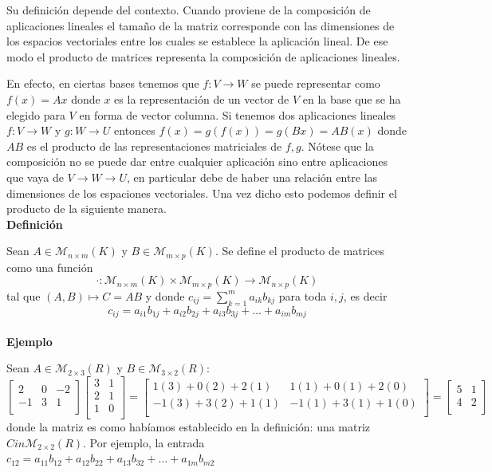 \documentclass[10pt]{article}
\begin{document}
Su definición depende del contexto. Cuando proviene de la composición de aplicaciones lineales el tamaño de la matriz corresponde con las dimensiones de los espacios vectoriales entre los cuales se establece la aplicación lineal. De ese modo el producto de matrices representa la composición de aplicaciones lineales.

En efecto, en ciertas bases tenemos que $f : V \longrightarrow W$ se puede representar como $f(x) = Ax$ donde $x$ es la representación de un vector de $V$ en la base que se ha elegido para $V$ en forma de vector columna. Si tenemos dos aplicaciones lineales $f : V \longrightarrow W$ y $g : W \longrightarrow U$ entonces $f(x) = g(f(x)) = g(Bx) = AB(x)$ donde $AB$ es el producto de las representaciones matriciales de $f, g$. Nótese que la composición no se puede dar entre cualquier aplicación sino entre aplicaciones que vaya de $V \rightarrow W \rightarrow U$, en particular debe de haber una relación entre las dimensiones de los espaciones vectoriales. Una vez dicho esto podemos definir el producto de la siguiente manera. \\

\noindent\textbf{Definición}

Sean $A \in \mathcal{M}_{n\times {m}}(K)$ y  $B \in \mathcal{M}_{m\times {p}}(K)$. Se define el producto de matrices como una función
$$
\cdot : \mathcal{M}_{n\times {m}}(K) \times \mathcal{M}_{m\times {p}}(K) \longrightarrow \mathcal{M}_{n\times {p}}(K)
$$ 
tal que $(A,B) \mapsto C = AB$ y donde $c_{ij}= \sum\limits_{k=1}^m a_{ik}b_{kj}$ para toda $i, j$, es decir
$$
c_{ij} = a_{i1}b_{1j} + a_{i2}b_{2j} + a_{i3}b_{3j} + \ldots + a_{im}b_{mj}
$$ \\

\noindent\textbf{Ejemplo}

Sean $A \in \mathcal{M}_{2\times {3}}(R)$ y $B \in \mathcal{M}_{3\times {2}}(R)$:
$$
\begin{bmatrix}
2 & 0 & -2 \\
-1 & 3 & 1 \\
\end{bmatrix}
\begin{bmatrix}
3 & 1 \\
2 & 1 \\
1 & 0 \\
\end{bmatrix}
=
\begin{bmatrix}
1(3) + 0(2) + 2(1) & 1(1) + 0(1) + 2(0) \\
-1(3) + 3(2) + 1(1) & -1(1) + 3(1) + 1(0) \\
\end{bmatrix}
=
\begin{bmatrix}
5 & 1 \\
4 & 2 \\
\end{bmatrix}
$$
donde la matriz es como habíamos establecido en la definición: una matriz $C in \mathcal{M}_{2\times {2}}(R)$. Por ejemplo, la entrada $c_{12} = a_{11}b_{12} + a_{12}b_{22} + a_{13}b_{32} + \ldots + a_{1m}b_{m2}$ \\
\end{document}
